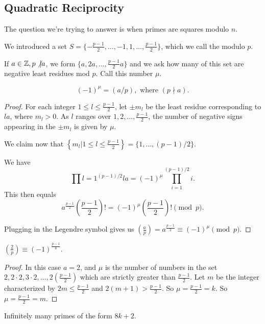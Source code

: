 \documentclass{article}
\begin{document}
\subsection{Quadratic Reciprocity}
The question we're trying to answer is when primes are squares modulo $n$.

We introduced a set $S = \{-\frac{p-1}{2}, \ldots, -1, 1, \ldots, \frac{p-1}{2}\}$, which we call the  modulo $p$.

If $a\in\mathbb Z, p \not \vert a$, we form $\{a, 2a, \ldots, \frac{p-1}{2} a\}$ and we ask how many of this set are negative least residues mod $p$. Call this number $\mu$.

\begin{lemma} 
	\[(-1)^\mu = (a / p), \text{ where } (p \nmid a).\]
\end{lemma}

\begin{proof}
	For each integer $1 \leq l \leq \frac{p-1}{2}$, let $\pm m_l$ be the least residue corresponding to $la$, where $m_l > 0$. As $l$ ranges over $1, 2, \ldots, \frac{p-1}{2}$, the number of negative signs appearing in the $\pm m_l$ is given by $\mu$.

	We claim now that $\left\{m_l | 1 \leq l \leq \frac{p-1}{2}\right\} = \{1, \ldots, (p-1)/2\}$. 

	We have \[\prod{l = 1}^{(p-1)/2} la = (-1)^\mu \prod_{i = 1}^{(p-1)/2} i.\] 
	This then equals \[a^{\frac{p-1}{2}} \left(\frac{p-1}{2}\right)! = (-1)^\mu \left(\frac{p-1}{2}\right)! \pmod p.\] 

	Plugging in the Legendre symbol gives us $\left(\frac{a}{p}\right) = a^{\frac{p-1}{2}} \equiv (-1)^\mu \pmod p$.
\end{proof}

\begin{proposition}
	$\left(\frac{2}{p}\right) \equiv (-1)^{\frac{p-1}{8}}$. 
\end{proposition}

\begin{proof}
	In this case $a = 2$, and $\mu$ is the number of numbers in the set $2, 2 \cdot 2, 3 \cdot 2, \ldots, 2\left(\frac{p-1}{2}\right)$
	which are strictly greater than $\frac{p-1}{2}$. Let $m$ be the integer characterized by 
	$2m \leq \frac{p-1}{2}$ and $2(m + 1) > \frac{p-1}{2}$. So $\mu = \frac{p-1}{2}= k$. So $\mu = \frac{p-1}{2} = m$.
\end{proof}

\begin{corollary}
	Infinitely many primes of the form $8k + 2$.
\end{corollary}
\end{document}
